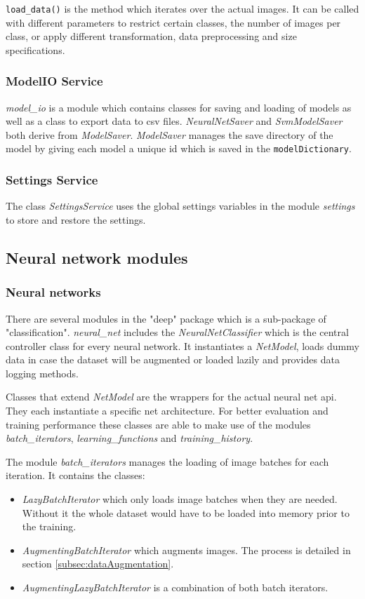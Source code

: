 		\verb|load_data()| is the method which iterates over the actual images. It can be called with different parameters to restrict certain classes, the number of images per class, or apply different transformation, data preprocessing and size specifications.
		
		\subsubsection*{ModelIO Service}
		\textit{model\_io} is a module which contains classes for saving and loading of models as well as a class to export data to \gls{csv} files. \textit{NeuralNetSaver} and \textit{SvmModelSaver} both derive from \textit{ModelSaver}. \textit{ModelSaver} manages the save directory of the model by giving each model a unique id which is saved in the \verb|modelDictionary|.
		
		\subsubsection*{Settings Service}
		The class \textit{SettingsService} uses the global settings variables in the module \textit{settings} to store and restore the settings.
			
	\subsection{Neural network modules}
			
		\subsubsection*{Neural networks}
		There are several modules in the "deep" package which is a sub-package of "classification". \textit{neural\_net} includes the \textit{NeuralNetClassifier} which is the central controller class for every neural network. It instantiates a \textit{NetModel}, loads dummy data in case the dataset will be augmented or loaded lazily and provides data logging methods.
		
		Classes that extend \textit{NetModel} are the wrappers for the actual neural net \gls{api}. They each instantiate a specific net architecture. For better evaluation and training performance these classes are able to make use of the modules \textit{batch\_iterators}, \textit{learning\_functions} and \textit{training\_history}.
		
		The module \textit{batch\_iterators} manages the loading of image batches for each iteration. It contains the classes:
		\begin{itemize}
			\item\textit{LazyBatchIterator} which only loads image batches when they are needed. Without it the whole dataset would have to be loaded into memory prior to the training.
			\item\textit{AugmentingBatchIterator} which augments images. The process is detailed in section \ref{subsec:dataAugmentation}.
			\item\textit{AugmentingLazyBatchIterator} is a combination of both batch iterators.
		\end{itemize}
	
